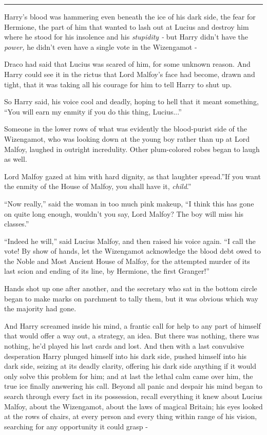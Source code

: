 \begin{center}\rule{3in}{0.4pt}\end{center}

Harry's blood was hammering even beneath the ice of his dark side, the
fear for Hermione, the part of him that wanted to lash out at Lucius and
destroy him where he stood for his insolence and his \emph{stupidity -}
but Harry didn't have the \emph{power,} he didn't even have a single
vote in the Wizengamot -

Draco had said that Lucius was scared of him, for some unknown reason.
And Harry could see it in the rictus that Lord Malfoy's face had become,
drawn and tight, that it was taking all his courage for him to tell
Harry to shut up.

So Harry said, his voice cool and deadly, hoping to hell that it meant
something, ``You will earn my enmity if you do this thing,
Lucius...''

Someone in the lower rows of what was evidently the blood-purist side of
the Wizengamot, who was looking down at the young boy rather than up at
Lord Malfoy, laughed in outright incredulity. Other plum-colored robes
began to laugh as well.

Lord Malfoy gazed at him with hard dignity, as that laughter spread.''If
you want the enmity of the House of Malfoy, you shall have it,
\emph{child}.''

``Now really,'' said the woman in too much pink makeup, ``I think this
has gone on quite long enough, wouldn't you say, Lord Malfoy? The boy
will miss his classes.''

``Indeed he will,'' said Lucius Malfoy, and then raised his voice again.
``I call the vote! By show of hands, let the Wizengamot acknowledge the
blood debt owed to the Noble and Most Ancient House of Malfoy, for the
attempted murder of its last scion and ending of its line, by Hermione,
the first Granger!''

Hands shot up one after another, and the secretary who sat in the bottom
circle began to make marks on parchment to tally them, but it was
obvious which way the majority had gone.

And Harry screamed inside his mind, a frantic call for help to any part
of himself that would offer a way out, a strategy, an idea. But there
was nothing, there was nothing, he'd played his last cards and lost. And
then with a last convulsive desperation Harry plunged himself into his
dark side, pushed himself into his dark side, seizing at its deadly
clarity, offering his dark side anything if it would only solve this
problem for him; and at last the lethal calm came over him, the true ice
finally answering his call. Beyond all panic and despair his mind began
to search through every fact in its possession, recall everything it
knew about Lucius Malfoy, about the Wizengamot, about the laws of
magical Britain; his eyes looked at the rows of chairs, at every person
and every thing within range of his vision, searching for any
opportunity it could grasp -

